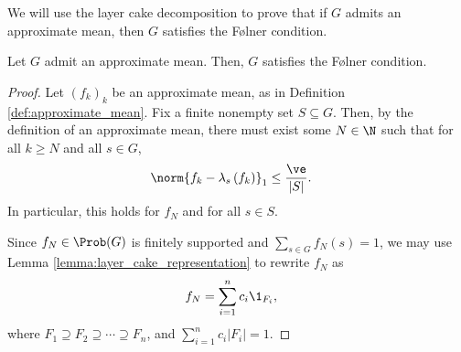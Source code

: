 We will use the layer cake decomposition to prove that if $G$ admits an approximate mean, then $G$ satisfies the Følner condition.
\begin{proposition}\label{prop:approx_mean_implies_folner}
  Let $G$ admit an approximate mean. Then, $G$ satisfies the Følner condition.
\end{proposition}
\begin{proof}
  Let $\left(f_k\right)_k$ be an approximate mean, as in Definition \ref{def:approximate_mean}. Fix a finite nonempty set $S \subseteq G$. Then, by the definition of an approximate mean, there must exist some $N\in\N$ such that for all $k\geq N$ and all $s\in G$,
  \begin{align*}
    \norm{f_k - \lambda_s\left(f_k\right)}_{1} &\leq \frac{\ve}{|S|}.
  \end{align*}
  In particular, this holds for $f_N$ and for all $s\in S$.\newline

  Since $f_N\in \Prob(G)$ is finitely supported and $\sum_{s\in G}f_N(s) = 1$, we may use Lemma \ref{lemma:layer_cake_representation} to rewrite $f_N$ as
  \begin{align*}
    f_N &= \sum_{i=1}^{n}c_i\1_{F_i},
  \end{align*}
  where $F_1 \supseteq F_2\supseteq \cdots \supseteq F_n$, and $\sum_{i=1}^{n}c_i\left\vert F_i \right\vert = 1$.\newline


\end{proof}
